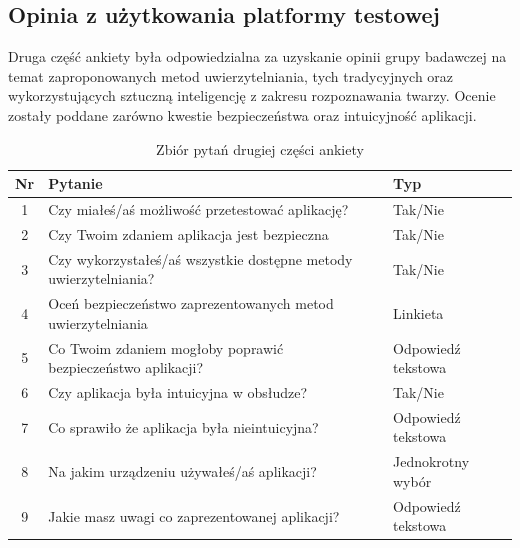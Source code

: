 \newpage
\subsection{Opinia z użytkowania platformy testowej} Druga część ankiety była odpowiedzialna za uzyskanie opinii grupy badawczej na temat zaproponowanych metod uwierzytelniania, tych tradycyjnych oraz wykorzystujących sztuczną inteligencję z zakresu rozpoznawania twarzy. Ocenie zostały poddane zarówno kwestie bezpieczeństwa oraz intuicyjność aplikacji.

\begin{table}[htb]
  \centering
  \caption{Zbiór pytań drugiej części ankiety}
  \label{tab:ankieta-part-2}\small
  \begin{tabularx}{\linewidth}{|c|X|X|} 
    \hline
  Nr & Pytanie & Typ \\ 
  \hline\hline
  1 & Czy miałeś/aś możliwość przetestować aplikację? & Tak/Nie\\
  2 & Czy Twoim zdaniem aplikacja jest bezpieczna & Tak/Nie \\
  3 & Czy wykorzystałeś/aś wszystkie dostępne metody uwierzytelniania? & Tak/Nie  \\
  4 & Oceń bezpieczeństwo zaprezentowanych metod uwierzytelniania & Linkieta \\
  5 & Co Twoim zdaniem mogłoby poprawić bezpieczeństwo aplikacji? & Odpowiedź tekstowa \\
  6 & Czy aplikacja była intuicyjna w obsłudze? & Tak/Nie \\
  7 & Co sprawiło że aplikacja była nieintuicyjna? & Odpowiedź tekstowa \\
  8 & Na jakim urządzeniu używałeś/aś aplikacji? & Jednokrotny wybór \\
  9 & Jakie masz uwagi co zaprezentowanej aplikacji? & Odpowiedź tekstowa \\
  \hline
  \end{tabularx}
  \end{table}


